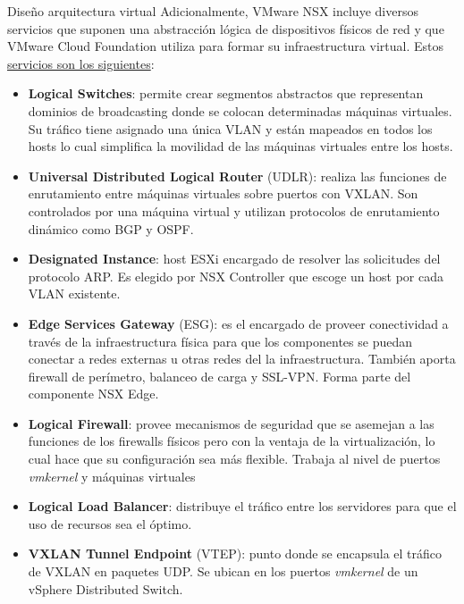 \begin{subsection}{Diseño arquitectura virtual}
Adicionalmente, VMware NSX incluye diversos servicios que suponen una abstracción lógica de dispositivos físicos de red y que VMware Cloud Foundation utiliza para formar su infraestructura virtual. Estos \underline{servicios son los siguientes}:
\begin{itemize}
    \item \textbf{Logical Switches}: permite crear segmentos abstractos que representan dominios de broadcasting donde se colocan determinadas máquinas virtuales. Su tráfico tiene asignado una única VLAN y están mapeados en todos los hosts lo cual simplifica la movilidad de las máquinas virtuales entre los hosts.
    \item \textbf{Universal Distributed Logical Router} (UDLR): realiza las funciones de enrutamiento entre máquinas virtuales sobre puertos con VXLAN. Son controlados por una máquina virtual y utilizan protocolos de enrutamiento dinámico como BGP y OSPF.
    \item \textbf{Designated Instance}: host ESXi encargado de resolver las solicitudes del protocolo ARP. Es elegido por NSX Controller que escoge un host por cada VLAN existente.
    \item \textbf{Edge Services Gateway} (ESG): es el encargado de proveer conectividad a través de la infraestructura física para que los componentes se puedan conectar a redes externas u otras redes del la infraestructura. También aporta firewall de perímetro, balanceo de carga y SSL-VPN. Forma parte del componente NSX Edge.
    \item \textbf{Logical Firewall}: provee mecanismos de seguridad que se asemejan a las funciones de los firewalls físicos pero con la ventaja de la virtualización, lo cual hace que su configuración sea más flexible. Trabaja al nivel de puertos \textit{vmkernel} y máquinas virtuales
    \item \textbf{Logical Load Balancer}: distribuye el tráfico entre los servidores para que el uso de recursos sea el óptimo.
    \item \textbf{VXLAN Tunnel Endpoint} (VTEP): punto donde se encapsula el tráfico de VXLAN en paquetes UDP. Se ubican en los puertos \textit{vmkernel} de un vSphere Distributed Switch.
\end{itemize}


\end{subsection}
